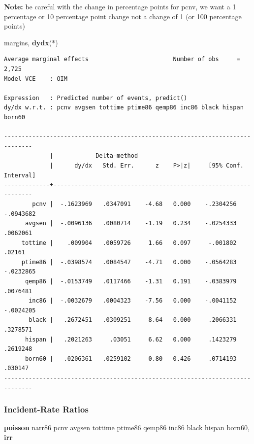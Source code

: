 \documentclass[
]{book}
\newenvironment{Shaded}{\begin{snugshade}}{\end{snugshade}}
\newcommand{\BaseNTok}[1]{\textcolor[rgb]{0.00,0.00,0.81}{#1}}
\newcommand{\KeywordTok}[1]{\textcolor[rgb]{0.13,0.29,0.53}{\textbf{#1}}}
\newcommand{\NormalTok}[1]{#1}
\begin{document}
\textbf{Note:} be careful with the change in percentage points for pcnv, we want a 1 percentage or 10 percentage point change not a change of 1 (or 100 percentage points)

\begin{Shaded}
\begin{Highlighting}[]
\NormalTok{margins, }\KeywordTok{dydx}\NormalTok{(*)}
\end{Highlighting}
\end{Shaded}

\begin{verbatim}
Average marginal effects                        Number of obs     =      2,725
Model VCE    : OIM

Expression   : Predicted number of events, predict()
dy/dx w.r.t. : pcnv avgsen tottime ptime86 qemp86 inc86 black hispan born60

------------------------------------------------------------------------------
             |            Delta-method
             |      dy/dx   Std. Err.      z    P>|z|     [95% Conf. Interval]
-------------+----------------------------------------------------------------
        pcnv |  -.1623969   .0347091    -4.68   0.000    -.2304256   -.0943682
      avgsen |  -.0096136   .0080714    -1.19   0.234    -.0254333    .0062061
     tottime |    .009904   .0059726     1.66   0.097     -.001802      .02161
     ptime86 |  -.0398574   .0084547    -4.71   0.000    -.0564283   -.0232865
      qemp86 |  -.0153749   .0117466    -1.31   0.191    -.0383979    .0076481
       inc86 |  -.0032679   .0004323    -7.56   0.000    -.0041152   -.0024205
       black |   .2672451   .0309251     8.64   0.000     .2066331    .3278571
      hispan |   .2021263     .03051     6.62   0.000     .1423279    .2619248
      born60 |  -.0206361   .0259102    -0.80   0.426    -.0714193     .030147
------------------------------------------------------------------------------
\end{verbatim}

\subsubsection*{Incident-Rate Ratios}\label{incident-rate-ratios}

\begin{Shaded}
\begin{Highlighting}[]
\KeywordTok{poisson}\NormalTok{ narr86 pcnv avgsen tottime ptime86 qemp86 inc86 }\BaseNTok{black}\NormalTok{ hispan born60, }\KeywordTok{irr}
\end{Highlighting}
\end{Shaded}
\end{document}
